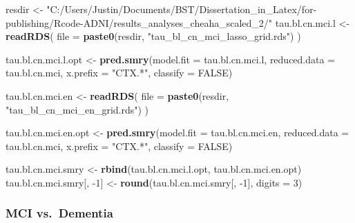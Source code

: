 \documentclass[
]{article}
\newenvironment{Shaded}{\begin{snugshade}}{\end{snugshade}}
\newcommand{\DataTypeTok}[1]{\textcolor[rgb]{0.13,0.29,0.53}{#1}}
\newcommand{\DecValTok}[1]{\textcolor[rgb]{0.00,0.00,0.81}{#1}}
\newcommand{\KeywordTok}[1]{\textcolor[rgb]{0.13,0.29,0.53}{\textbf{#1}}}
\newcommand{\NormalTok}[1]{#1}
\newcommand{\OtherTok}[1]{\textcolor[rgb]{0.56,0.35,0.01}{#1}}
\newcommand{\StringTok}[1]{\textcolor[rgb]{0.31,0.60,0.02}{#1}}
\begin{document}
\begin{Shaded}
\begin{Highlighting}[]
\NormalTok{resdir <-}\StringTok{ "C:/Users/Justin/Documents/BST/Dissertation_in_Latex/for-publishing/Rcode-ADNI/results_analyses_cheaha_scaled_2/"}
\NormalTok{tau.bl.cn.mci.l <-}\StringTok{ }\KeywordTok{readRDS}\NormalTok{(}
  \DataTypeTok{file =} \KeywordTok{paste0}\NormalTok{(resdir, }\StringTok{"tau_bl_cn_mci_lasso_grid.rds"}\NormalTok{)}
\NormalTok{)}

\NormalTok{tau.bl.cn.mci.l.opt <-}\StringTok{ }\KeywordTok{pred.smry}\NormalTok{(}\DataTypeTok{model.fit =}\NormalTok{ tau.bl.cn.mci.l,}
                       \DataTypeTok{reduced.data =}\NormalTok{ tau.bl.cn.mci,}
                       \DataTypeTok{x.prefix =} \StringTok{"CTX.*"}\NormalTok{,}
                       \DataTypeTok{classify =} \OtherTok{FALSE}\NormalTok{)}

\NormalTok{tau.bl.cn.mci.en <-}\StringTok{ }\KeywordTok{readRDS}\NormalTok{(}
  \DataTypeTok{file =} \KeywordTok{paste0}\NormalTok{(resdir, }\StringTok{"tau_bl_cn_mci_en_grid.rds"}\NormalTok{)}
\NormalTok{)}

\NormalTok{tau.bl.cn.mci.en.opt <-}\StringTok{ }\KeywordTok{pred.smry}\NormalTok{(}\DataTypeTok{model.fit =}\NormalTok{ tau.bl.cn.mci.en,}
                       \DataTypeTok{reduced.data =}\NormalTok{ tau.bl.cn.mci,}
                       \DataTypeTok{x.prefix =} \StringTok{"CTX.*"}\NormalTok{,}
                       \DataTypeTok{classify =} \OtherTok{FALSE}\NormalTok{)}

\NormalTok{tau.bl.cn.mci.smry <-}\StringTok{ }\KeywordTok{rbind}\NormalTok{(tau.bl.cn.mci.l.opt,}
\NormalTok{                          tau.bl.cn.mci.en.opt)}
\NormalTok{tau.bl.cn.mci.smry[, }\DecValTok{-1}\NormalTok{] <-}\StringTok{ }\KeywordTok{round}\NormalTok{(tau.bl.cn.mci.smry[, }\DecValTok{-1}\NormalTok{], }\DataTypeTok{digits =} \DecValTok{3}\NormalTok{)}
\end{Highlighting}
\end{Shaded}

\hypertarget{mci-vs.-dementia-1}{%
\subsubsection{MCI vs.~Dementia}\label{mci-vs.-dementia-1}}
\end{document}
